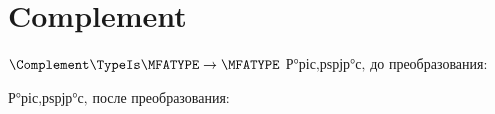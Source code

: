 \section{Complement}
\begin{frame}{$\Complement\TypeIs\MFATYPE\to\MFATYPE$}
	Р°ріс‚рѕрјр°с‚ до преобразования:

	Р°ріс‚рѕрјр°с‚ после преобразования:
\end{frame}